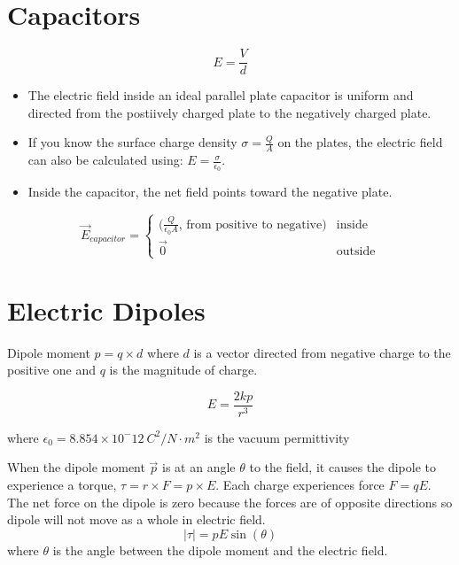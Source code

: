 \documentclass{article}
\begin{document}
\section*{Capacitors}

\[E=\frac{V}{d}\]

\begin{itemize}
    \item The electric field inside an ideal parallel plate capacitor is uniform and directed from
    the postiively charged plate to the negatively charged plate.
    \item If you know the surface charge density $\sigma=\frac{Q}{A}$ on the plates, the electric
    field can also be calculated using: $E=\frac{\sigma}{\epsilon_0}$.
    \item Inside the capacitor, the net field points toward the negative plate.
\end{itemize}

\[\vec{E}_{capacitor}=\begin{cases}
\big(\frac{Q}{\epsilon_0 A}\text{, from positive to negative}\big) & \text{inside} \\ 
\vec{0} & \text{outside}
\end{cases}\]

\section*{Electric Dipoles}
Dipole moment $p=q\times d$ where $d$ is a vector directed from negative charge to the positive one
and $q$ is the magnitude of charge.

\[E=\frac{2kp}{r^3}\]

where $\epsilon_0=8.854\times 10^-12\: C^2 / N\cdot m^2$ is the vacuum permittivity

When the dipole moment $\vec{p}$ is at an angle $\theta$ to the field, it causes the dipole to
experience a torque, $\tau = r\times F = p\times E$. Each charge experiences force $F=qE$. The net
force on the
dipole is zero because the forces are of opposite directions so dipole will not move as a whole in
electric field.
\[|\tau | = pE\sin (\theta)\] where $\theta$ is the angle between the dipole moment and the
electric field.
\end{document}

